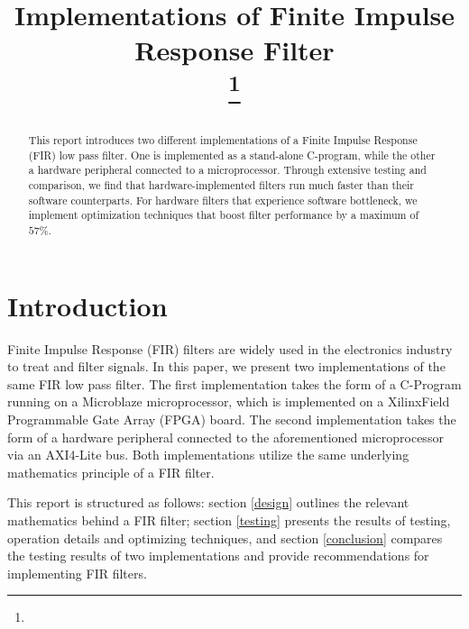 \documentclass[conference]{IEEEtran}
\begin{document}
\title{Implementations of Finite Impulse Response Filter\\
{\footnotesize \textsuperscript{}
\thanks{}
}

\author{
}}

\maketitle

\begin{abstract}
This report introduces two different implementations of a Finite Impulse Response (FIR) low pass filter. One is implemented as a stand-alone C-program, while the other a hardware peripheral connected to a microprocessor. Through extensive testing and comparison, we find that hardware-implemented filters run much faster than their software counterparts. For hardware filters that experience software bottleneck, we implement optimization techniques that boost filter performance by a maximum of $57\%$.
\end{abstract}


\section{Introduction} \label{introduction}
Finite Impulse Response (FIR) filters are widely used in the electronics industry to treat and filter signals. In this paper, we present two implementations of the same FIR low pass filter. The first implementation takes the form of a C-Program running on a Microblaze\textregistered{} microprocessor, which is implemented on a Xilinx\textregistered \;Field Programmable Gate Array (FPGA) board. The second implementation takes the form of a hardware peripheral connected to the aforementioned microprocessor via an AXI4-Lite bus. Both implementations utilize the same underlying mathematics principle of a FIR filter. 

This report is structured as follows: section \ref{design} outlines the relevant mathematics behind a FIR filter; section \ref{testing} presents the results of testing, operation details and optimizing techniques, and section \ref{conclusion} compares the testing results of two implementations and provide recommendations for implementing FIR filters.
\end{document}
